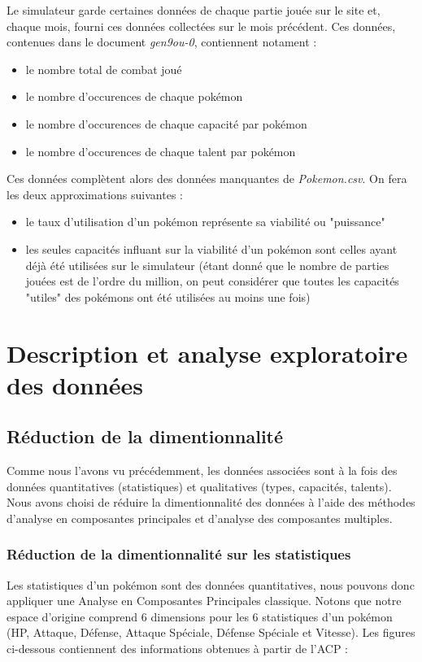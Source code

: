 \documentclass[a4paper,12pt]{article}
\begin{document}
Le simulateur garde certaines données de chaque partie jouée sur le site et,
chaque mois, fourni ces données collectées sur le mois précédent. Ces données,
contenues dans le document \textit{gen9ou-0}, contiennent notament :
\begin{itemize}
    \item le nombre total de combat joué
    \item le nombre d'occurences de chaque pokémon
    \item le nombre d'occurences de chaque capacité par pokémon
    \item le nombre d'occurences de chaque talent par pokémon
\end{itemize}
Ces données complètent alors des données manquantes de \textit{Pokemon.csv}. On
fera les deux approximations suivantes :
\begin{itemize}
    \item le taux d'utilisation d'un pokémon représente sa viabilité ou
    "puissance"
    \item les seules capacités influant sur la viabilité d'un pokémon sont
    celles ayant déjà été utilisées sur le simulateur (étant donné que le nombre
    de parties jouées est de l'ordre du million, on peut considérer que toutes
    les capacités "utiles" des pokémons ont été utilisées au moins une fois)
\end{itemize}
\section{Description et analyse exploratoire des données}
\subsection{Réduction de la dimentionnalité}
Comme nous l'avons vu précédemment, les données associées sont à la fois des
données quantitatives (statistiques) et qualitatives (types, capacités,
talents). Nous avons choisi de réduire la dimentionnalité des données à l'aide
des méthodes d'analyse en composantes principales et d'analyse des composantes
multiples.
\subsubsection{Réduction de la dimentionnalité sur les statistiques}
Les statistiques d'un pokémon sont des données quantitatives, nous pouvons donc
appliquer une Analyse en Composantes Principales classique. Notons que notre
espace d'origine comprend 6 dimensions pour les 6 statistiques d'un pokémon (HP,
Attaque, Défense, Attaque Spéciale, Défense Spéciale et Vitesse). Les figures
ci-dessous contiennent des informations obtenues à partir de l'ACP :
\end{document}
